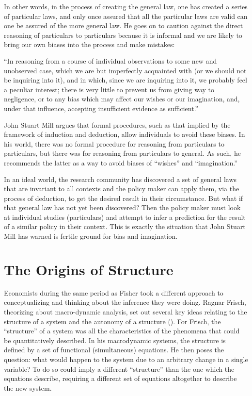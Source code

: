 \documentclass[a4paper,12pt]{article}
\begin{document}
In other words, in the process of creating the general law, one has created a series of particular laws, and only once assured that all the particular laws are valid can one be assured of the more general law. He goes on to caution against the direct reasoning of particulars to particulars because it is informal and we are likely to bring our own biases into the process and make mistakes:
%
\begin{displayquote}
``In reasoning from a course of individual observations to some new and unobserved case, which we are but imperfectly acquainted with (or we should not be inquiring into it), and in which, since we are inquiring into it, we probably feel a peculiar interest; there is very little to prevent us from giving way to negligence, or to any bias which may affect our wishes or our imagination, and, under that influence, accepting insufficient evidence as sufficient.'' \parencite{mill1884}
\end{displayquote}

John Stuart Mill argues that formal procedures, such as that implied by the framework of induction and deduction, allow individuals to avoid these biases. In his world, there was no formal procedure for reasoning from particulars to particulars, but there was for reasoning from particulars to general. As such, he recommends the latter as a way to avoid biases of ``wishes'' and ``imagination.''

In an ideal world, the research community has discovered a set of general laws that are invariant to all contexts and the policy maker can apply them, via the process of deduction, to get the desired result in their circumstance. But what if that general law has not yet been discovered? Then the policy maker must look at individual studies (particulars) and attempt to infer a prediction for the result of a similar policy in their context. This is exactly the situation that John Stuart Mill has warned is fertile ground for bias and imagination.

\section{The Origins of Structure}

Economists during the same period as Fisher took a different approach to conceptualizing and thinking about the inference they were doing. Ragnar Frisch, theorizing about macro-dynamic analysis, set out several key ideas relating to the structure of a system and the autonomy of a structure (\cite{Frisch1995}). For Frisch, the ``structure'' of a system was all the characteristics of the phenomena that could be quantitatively described. In his macrodynamic systems, the structure is defined by a set of functional (simultaneous) equations. He then poses the question: what would happen to the system due to an arbitrary change in a single variable? To do so could imply a different ``structure'' than the one which the equations describe, requiring a different set of equations altogether to describe the new system.
\end{document}
